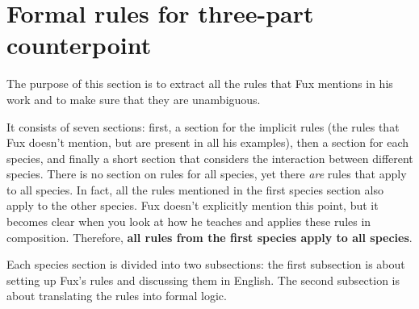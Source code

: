 \chapter{Formal rules for three-part counterpoint}\label{chapter:species}
The purpose of this section is to extract all the rules that Fux mentions in his work and to make sure that they are unambiguous.

It consists of seven sections: first, a section for the implicit rules (the rules that Fux doesn't mention, but are present in all his examples), then a section for each species, and finally a short section that considers the interaction between different species. There is no section on rules for all species, yet there \textit{are} rules that apply to all species. In fact, all the rules mentioned in the first species section also apply to the other species. Fux doesn't explicitly mention this point, but it becomes clear when you look at how he teaches and applies these rules in composition. Therefore, \textbf{all rules from the first species apply to all species}.

Each species section is divided into two subsections: the first subsection is about setting up Fux's rules and discussing them in English. The second subsection is about translating the rules into formal logic.

